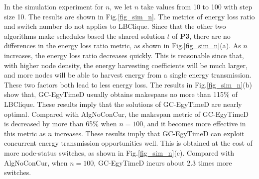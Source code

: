\documentclass[12pt,journal,onecolumn,draftcls]{IEEEtran}
\begin{document}
In the simulation experiment for $n$, we let $n$ take values from 10 to 100 with step size 10. The results are shown in Fig.\ref{fig_sim_n}. The metrics of energy loss ratio and switch number do not applies to LBClique. Since that the other two algorithms make schedules based the shared solution $t$ of \textbf{P3}, there are no differences in the energy loss ratio metric, as shown in Fig.\ref{fig_sim_n}(a). As $n$ increases, the energy loss ratio decreases quickly. This is reasonable since that, with higher node density, the energy harvesting coefficients will be much larger, and more nodes will be able to harvest energy from a single energy transmission. These two factors both lead to less energy loss. The results in Fig.\ref{fig_sim_n}(b) show that, GC-EgyTimeD usually obtains makespans no more than 115\% of LBClique. These results imply that the solutions of GC-EgyTimeD are nearly optimal. Compared with AlgNoConCur, the makespan metric of GC-EgyTimeD is decreased by more than 65\% when $n{=}100$, and it becomes more effective in this metric as $n$ increases. These results imply that GC-EgyTimeD can exploit concurrent energy transmission opportunities well. This is obtained at the cost of more node-status switches, as shown in Fig.\ref{fig_sim_n}(c). Compared with AlgNoConCur, when $n{=}100$, GC-EgyTimeD incurs about 2.3 times more switches.
\end{document}
